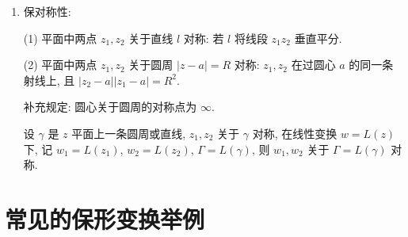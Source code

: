 \documentclass[theorem=false,mathfont=none,openany,sub3section]{easybook}
\begin{document}
\begin{enumerate}
  \begin{theorem}
    线性变换 $w=\frac{az+b}{cz+d}$ 下, 记 $w_{i}=\frac{az_{i}+b}{cz_{i}+d}$ ($i=1,2,3,4$), 则
    \[
    (w_{1},w_{2},w_{3},w_{4})=(z_{1},z_{2},z_{3},z_{4}).
    \]
  \end{theorem}

  \begin{proof}
    \[
    w_{i}-w_{j}=\frac{az_{i}+b}{cz_{i}+d}-\frac{az_{j}+b}{cz_{j}+d}
    =\frac{(ad-bc)(z_{i}-z_{j})}{(cz_{i}+d)(cz_{j}+d)},
    \]
    代入交比定义即得 $(w_{1},w_{2},w_{3},w_{4})=(z_{1},z_{2},z_{3},z_{4})$.
  \end{proof}

  \begin{remark}
    四个复数中一个可以为 $\infty$, 例如:
    \[
    (\infty,z_{2},z_{3},z_{4})=\frac{1}{z_{4}-z_{2}}:\frac{1}{z_{3}-z_{2}},\qquad
    (z_{1},z_{2},z_{3},\infty)=1:\frac{z_{3}-z_{1}}{z_{3}-z_{2}}.
    \]
    线性变换 $w=\frac{az+b}{cz+d}$ 中四个系数只有三个独立.
  \end{remark}

  \begin{example}
    求线性变换 $w=L(z)$ 使 $z=2,i,-2$ 分别对应 $w=-1,i,1$.

    根据线性变换保交比性,
    \[
    \frac{w+1}{w-i}:\frac{1+1}{1-i}=\frac{z-2}{z-i}:\frac{-2-2}{-2-i},
    \]
    解出 $w=\dfrac{z-6i}{3iz-2}$.
  \end{example}

  \item 保对称性:\par
  \begin{definition}
    (1) 平面中两点 $z_{1},z_{2}$ 关于直线 $l$ 对称: 若 $l$ 将线段 $z_{1}z_{2}$ 垂直平分.\par
    (2) 平面中两点 $z_{1},z_{2}$ 关于圆周 $|z-a|=R$ 对称: $z_{1},z_{2}$ 在过圆心 $a$ 的同一条射线上, 且 $|z_{2}-a||z_{1}-a|=R^{2}$.\par
    补充规定: 圆心关于圆周的对称点为 $\infty$.
  \end{definition}

  \begin{theorem}
    设 $\gamma$ 是 $z$ 平面上一条圆周或直线, $z_{1},z_{2}$ 关于 $\gamma$ 对称, 在线性变换 $w=L(z)$ 下,
    记 $w_{1}=L(z_{1})$, $w_{2}=L(z_{2})$, $\Gamma=L(\gamma)$, 则 $w_{1},w_{2}$ 关于 $\Gamma=L(\gamma)$ 对称.
  \end{theorem}
\end{enumerate}

\newpage

\section{常见的保形变换举例}
\end{document}
